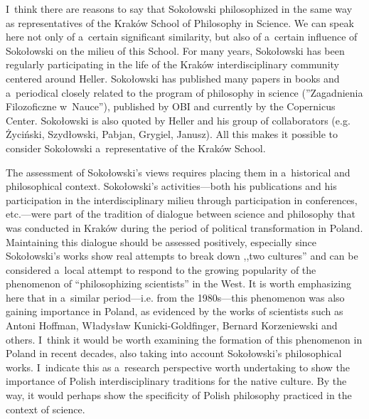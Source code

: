 I~think there are reasons to say that Sokołowski philosophized in the same way as representatives of the Kraków School of Philosophy in Science. We can speak here not only of a~certain significant similarity, but also of a~certain influence of Sokołowski on the milieu of this School. For many years, Sokołowski has been regularly participating in the life of the Kraków interdisciplinary community centered around Heller. Sokołowski has published many papers in books and a~periodical closely related to the program of philosophy in science (''Zagadnienia Filozoficzne w~Nauce''), published by OBI and currently by the Copernicus Center. Sokołowski is also quoted by Heller and his group of collaborators (e.g. Życiński, Szydłowski, Pabjan, Grygiel, Janusz). All this makes it possible to consider Sokołowski a~representative of the Kraków School.



The assessment of Sokołowski's views requires placing them in a~historical and philosophical context. Sokołowski's activities---both his publications and his participation in the interdisciplinary milieu through participation in conferences, etc.---were part of the tradition of dialogue between science and philosophy that was conducted in Kraków during the period of political transformation in Poland. Maintaining this dialogue should be assessed positively, especially since Sokołowski's works show real attempts to break down ,,two cultures'' 
\parencite[][]{Snow1999Dwie} %
 and can be considered a~local attempt to respond to the growing popularity of the phenomenon of ``philosophizing scientists'' in the West. It is worth emphasizing here that in a~similar period---i.e. from the 1980s---this phenomenon was also gaining importance in Poland, as evidenced by the works of scientists such as Antoni Hoffman, Władysław Kunicki-Goldfinger, Bernard Korzeniewski and others. I~think it would be worth examining the formation of this phenomenon in Poland in recent decades, also taking into account Sokołowski's philosophical works. I~indicate this as a~research perspective worth undertaking to show the importance of Polish interdisciplinary traditions for the native culture. By the way, it would perhaps show the specificity of Polish philosophy practiced in the context of science.



